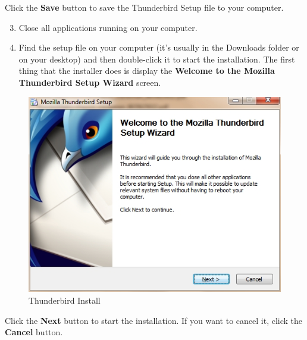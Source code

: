 Click the \textbf{Save} button to save the Thunderbird Setup file to
your computer.

\begin{enumerate}[1.]
\setcounter{enumi}{2}
\item
  Close all applications running on your computer.
\item
  Find the setup file on your computer (it's usually in the Downloads
  folder or on your desktop) and then double-click it to start the
  installation. The first thing that the installer does is display the
  \textbf{Welcome to the Mozilla Thunderbird Setup Wizard} screen.
\end{enumerate}
\begin{figure}[htbp]
\centering
\includegraphics{thunderbird_inst_3.jpg}
\caption{Thunderbird Install}
\end{figure}

Click the \textbf{Next} button to start the installation. If you want to
cancel it, click the \textbf{Cancel} button.

